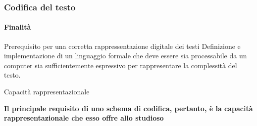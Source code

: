 \begin{frame}
	\frametitle{Codifica del testo}
	\framesubtitle{Finalità}
	\addtocounter{nframe}{1}

	\begin{block}{Prerequisito per una corretta rappressentazione digitale dei testi}
		Definizione e implementazione di un linguaggio formale che deve essere sia processabile da un computer sia sufficientemente espressivo per rappresentare la complessità del testo.
	\end{block}

	\begin{block}{Capacità rappresentazionale}
		\begin{center}
			\textbf{Il principale requisito di uno schema di codifica, pertanto, è la capacità rappresentazionale che esso offre allo studioso}
		\end{center}
	\end{block}

\end{frame}


